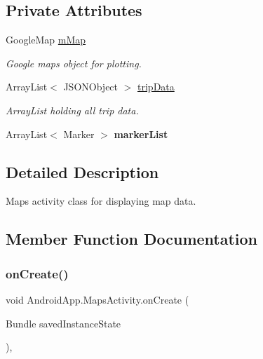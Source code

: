 \subsection*{Private Attributes}
\begin{DoxyCompactItemize}
\item 
\mbox{\label{class_android_app_1_1_maps_activity_a373d4c770d2ab34538f9288d7c0e83ea}} 
Google\+Map \hyperlink{class_android_app_1_1_maps_activity_a373d4c770d2ab34538f9288d7c0e83ea}{m\+Map}
\begin{DoxyCompactList}\small\item\em Google maps object for plotting. \end{DoxyCompactList}\item 
\mbox{\label{class_android_app_1_1_maps_activity_ad2fa23bd9f7f5a501e91329413608528}} 
Array\+List$<$ J\+S\+O\+N\+Object $>$ \hyperlink{class_android_app_1_1_maps_activity_ad2fa23bd9f7f5a501e91329413608528}{trip\+Data}
\begin{DoxyCompactList}\small\item\em Array\+List holding all trip data. \end{DoxyCompactList}\item 
\mbox{\label{class_android_app_1_1_maps_activity_a85c831a59d0468fc03e695aa9beab77e}} 
Array\+List$<$ Marker $>$ {\bfseries marker\+List}
\end{DoxyCompactItemize}


\subsection{Detailed Description}
Maps activity class for displaying map data. 

\subsection{Member Function Documentation}
\mbox{\label{class_android_app_1_1_maps_activity_a179ec8e25e279c4fa33aa74a90019489}} 
\subsubsection{\texorpdfstring{on\+Create()}{onCreate()}}
{\footnotesize\ttfamily void Android\+App.\+Maps\+Activity.\+on\+Create (\begin{DoxyParamCaption}\item[{Bundle}]{saved\+Instance\+State }\end{DoxyParamCaption})\hspace{0.3cm}{\ttfamily [inline]}, {\ttfamily [protected]}}



